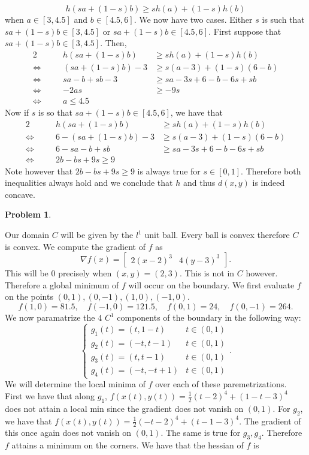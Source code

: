 \documentclass[12pt, a4paper]{article}
\newtheorem{problem}{Problem}
\theoremstyle{definition}
\newcommand{\grad}{\nabla}
\newcommand{\bmat}[1]{\begin{bmatrix}#1\end{bmatrix}}
\begin{document}
$$h(s a + (1-s)b) \geq s h(a)+  (1-s)h(b)$$ 
when $a\in [3,4.5]$ and $b\in [4.5,6]$. We now have two cases. Either $s$ is such that $s a + (1-s)b \in [3,4.5]$ or $s a + (1-s)b \in [4.5,6]$. First suppose that $s a + (1-s)b \in [3,4.5]$. Then, 
\begin{alignat*}{2}
	& \quad & h(s a + (1-s)b) &\geq s h(a)+  (1-s)h(b)\\
	\iff && (s a + (1-s)b)-3 &\geq s (a-3) + (1-s)(6-b)\\
	\iff &&  sa -b + sb - 3 & \geq sa - 3s + 6 - b - 6s + sb\\
	\iff && -2as &\geq -9 s\\ 
	\iff && a \leq 4.5
\end{alignat*}
Now if $s$ is so that $s a + (1-s)b \in [4.5,6]$, we have that 
\begin{alignat*}{2}
	& \quad & h(s a + (1-s)b) &\geq s h(a)+  (1-s)h(b)\\
	\iff && 6 - (s a + (1-s)b)-3 &\geq s (a-3) + (1-s)(6-b)\\
	\iff && 6 - sa - b + sb & \geq sa - 3s + 6 - b - 6s + sb\\
	\iff &&  2b - bs + 9s \geq 9
\end{alignat*}
Note however that $2b - bs + 9s \geq 9$ is always true for $s\in[0,1]$. Therefore both inequalities always hold and we conclude that $h$  and thus $d(x,y)$ is indeed concave.
\newpage
\begin{problem}
\end{problem}
Our domain $C$ will be given by the $l^1$ unit ball. Every ball is convex therefore $C$ is convex. We compute the gradient of $f$ as 
$$\grad f(x) = \bmat{2(x-2)^3 & 4(y-3)^3}.$$
This will be $0$ precisely when $(x,y) = (2,3)$. This is not in $C$ however. Therefore a global minimum of $f$ will occur on the boundary. We first evaluate $f$ on the points $(0,1), (0,-1), (1,0), (-1,0)$. 
$$f(1,0) = 81.5, \quad f(-1,0) = 121.5, \quad f(0,1) = 24, \quad f(0,-1) = 264.$$
We now paramatrize the $4$ $C^1$ components of the boundary in the following way: 
$$\begin{cases}
	g_1(t) = (t,1-t) & t\in(0,1)\\
	g_2(t) = (-t, t-1) & t\in (0,1)\\
	g_3(t) = (t,t-1) & t\in (0,1)\\ 
	g_4(t) = (-t,-t+1) & t\in (0,1)
\end{cases}.$$
We will determine the local minima of $f$ over each of these paremetrizations. 
First we have that along $g_1$, $f(x(t), y(t)) = \frac{1}{2}(t-2)^4 + (1-t-3)^4$ does not attain a local min since the gradient does not vanish on $(0,1)$. For $g_2$, we have that $f(x(t), y(t)) = \frac{1}{2}(-t-2)^4 + (t-1-3)^4$. The gradient of this once again does not vanish on $(0,1)$. The same is true for $g_3,g_4$. Therefore $f$ attains a minimum on the corners. We have that the hessian of $f$ is 
\end{document}

